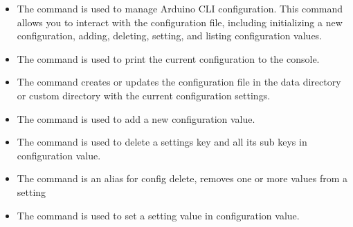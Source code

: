\begin{itemize}
	\item {}
	
	The command  is used to manage Arduino CLI configuration. This command allows you to interact with the configuration file, including initializing a new configuration, adding, deleting, setting, and listing configuration values.
	
	
	\item {}
	
	The command  is used to print the current configuration to the console.
	
	
	\item {}
	
	The command  creates or updates the configuration file in the data directory or custom directory with the current configuration settings.
	
	
	\item {}
	
	The command  is used to add a new configuration value.
	
	
	\item {}
	
	The command  is used to delete a settings key and all its sub keys in configuration value.
	
	
	\item {}
	
	The command  is an alias for config delete, removes one or more values from a setting
	
	
	\item {}
	
	The command  is used to set a setting value in configuration value.
	
	

\end{itemize}
